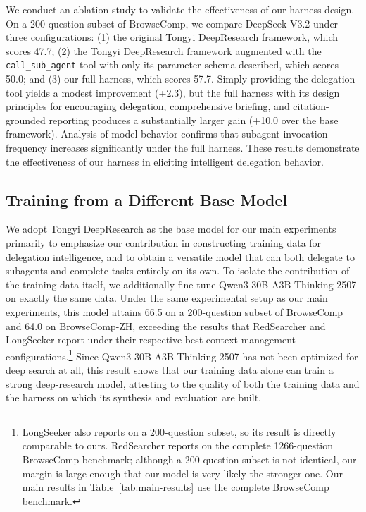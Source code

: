 \documentclass[table]{gtech}
\begin{document}
We conduct an ablation study to validate the effectiveness of our harness design. On a 200-question subset of BrowseComp, we compare DeepSeek V3.2 under three configurations: (1) the original Tongyi DeepResearch framework, which scores 47.7; (2) the Tongyi DeepResearch framework augmented with the \texttt{call\_sub\_agent} tool with only its parameter schema described, which scores 50.0; and (3) our full harness, which scores 57.7. Simply providing the delegation tool yields a modest improvement (+2.3), but the full harness with its design principles for encouraging delegation, comprehensive briefing, and citation-grounded reporting produces a substantially larger gain (+10.0 over the base framework). Analysis of model behavior confirms that subagent invocation frequency increases significantly under the full harness. These results demonstrate the effectiveness of our harness in eliciting intelligent delegation behavior.

\subsection{Training from a Different Base Model}

We adopt Tongyi DeepResearch as the base model for our main experiments primarily to emphasize our contribution in constructing training data for delegation intelligence, and to obtain a versatile model that can both delegate to subagents and complete tasks entirely on its own. To isolate the contribution of the training data itself, we additionally fine-tune Qwen3-30B-A3B-Thinking-2507 on exactly the same data. Under the same experimental setup as our main experiments, this model attains 66.5 on a 200-question subset of BrowseComp and 64.0 on BrowseComp-ZH, exceeding the results that RedSearcher and LongSeeker report under their respective best context-management configurations.\footnote{LongSeeker also reports on a 200-question subset, so its result is directly comparable to ours. RedSearcher reports on the complete 1266-question BrowseComp benchmark; although a 200-question subset is not identical, our margin is large enough that our model is very likely the stronger one. Our main results in Table~\ref{tab:main-results} use the complete BrowseComp benchmark.} Since Qwen3-30B-A3B-Thinking-2507 has not been optimized for deep search at all, this result shows that our training data alone can train a strong deep-research model, attesting to the quality of both the training data and the harness on which its synthesis and evaluation are built.
\end{document}
